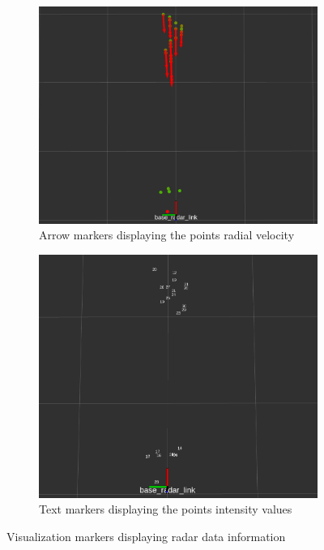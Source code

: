 \begin{figure}[ht!]
  \centering
  \begin{subfigure}[b]{0.49\linewidth}
    \includegraphics[width=\linewidth]{imgs/chapter4/dopplermarker.png}
     \caption{Arrow markers displaying the points radial velocity}
     \label{fig:dopplermarker}
  \end{subfigure}
  \begin{subfigure}[b]{0.44\linewidth}
    \includegraphics[width=\linewidth]{imgs/chapter4/intensitymarker.png}
    \caption{Text markers displaying the points intensity values}
    \label{fig:intensitymarker}
  \end{subfigure}
  \caption{Visualization markers displaying radar data information}
  \label{fig:vismark}
\end{figure}


